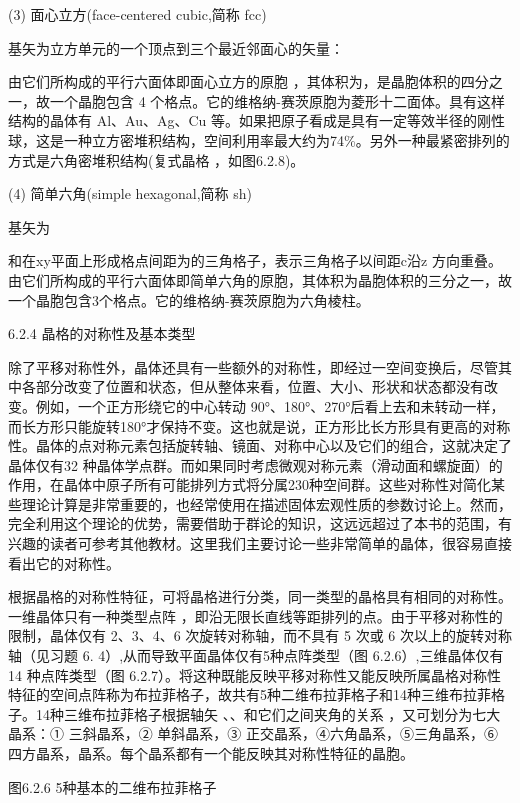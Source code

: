 (3) 面心立方(face-centered cubic,简称 fcc)

基矢为立方单元的一个顶点到三个最近邻面心的矢量：



由它们所构成的平行六面体即面心立方的原胞 ，其体积为，是晶胞体积的四分之一，故一个晶胞包含 4 个格点。它的维格纳-赛茨原胞为菱形十二面体。具有这样结构的晶体有 Al、Au、Ag、Cu 等。如果把原子看成是具有一定等效半径的刚性球，这是一种立方密堆积结构，空间利用率最大约为74\%。另外一种最紧密排列的方式是六角密堆积结构(复式晶格 ，如图6.2.8)。

(4) 简单六角(simple hexagonal,简称 sh)

基矢为



和在xy平面上形成格点间距为的三角格子，表示三角格子以间距c沿z 方向重叠。由它们所构成的平行六面体即简单六角的原胞，其体积为晶胞体积的三分之一，故一个晶胞包含3个格点。它的维格纳-赛茨原胞为六角棱柱。



6.2.4 晶格的对称性及基本类型

除了平移对称性外，晶体还具有一些额外的对称性，即经过一空间变换后，尽管其中各部分改变了位置和状态，但从整体来看，位置、大小、形状和状态都没有改变。例如，一个正方形绕它的中心转动 90°、180°、270°后看上去和未转动一样，而长方形只能旋转180°才保持不变。这也就是说，正方形比长方形具有更高的对称性。晶体的点对称元素包括旋转轴、镜面、对称中心以及它们的组合，这就决定了晶体仅有32 种晶体学点群。而如果同时考虑微观对称元素（滑动面和螺旋面）的作用，在晶体中原子所有可能排列方式将分属230种空间群。这些对称性对简化某些理论计算是非常重要的，也经常使用在描述固体宏观性质的参数讨论上。然而，完全利用这个理论的优势，需要借助于群论的知识，这远远超过了本书的范围，有兴趣的读者可参考其他教材。这里我们主要讨论一些非常简单的晶体，很容易直接看出它的对称性。

根据晶格的对称性特征，可将晶格进行分类，同一类型的晶格具有相同的对称性。一维晶体只有一种类型点阵 ，即沿无限长直线等距排列的点。由于平移对称性的限制，晶体仅有 2、3、4、6 次旋转对称轴，而不具有 5 次或 6 次以上的旋转对称轴（见习题 6. 4）,从而导致平面晶体仅有5种点阵类型（图 6.2.6）,三维晶体仅有 14 种点阵类型（图 6.2.7）。将这种既能反映平移对称性又能反映所属晶格对称性特征的空间点阵称为布拉菲格子，故共有5种二维布拉菲格子和14种三维布拉菲格子。14种三维布拉菲格子根据轴矢 、、和它们之间夹角的关系 ，又可划分为七大晶系：① 三斜晶系，② 单斜晶系，③ 正交晶系，④六角晶系，⑤三角晶系，⑥ 四方晶系，晶系。每个晶系都有一个能反映其对称性特征的晶胞。



图6.2.6 5种基本的二维布拉菲格子



